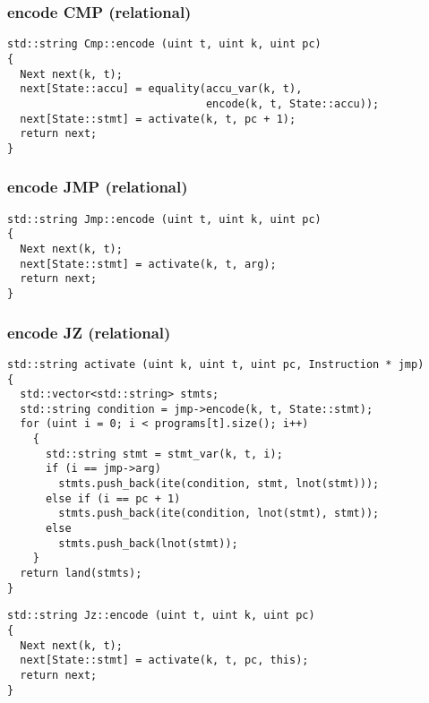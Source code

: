 \subsubsection{encode CMP (relational)}

\begin{lstlisting}[style=c++]
std::string Cmp::encode (uint t, uint k, uint pc)
{
  Next next(k, t);
  next[State::accu] = equality(accu_var(k, t),
                               encode(k, t, State::accu));
  next[State::stmt] = activate(k, t, pc + 1);
  return next;
}
\end{lstlisting}

\subsubsection{encode JMP (relational)}

\begin{lstlisting}[style=c++]
std::string Jmp::encode (uint t, uint k, uint pc)
{
  Next next(k, t);
  next[State::stmt] = activate(k, t, arg);
  return next;
}
\end{lstlisting}

\subsubsection{encode JZ (relational)}

\begin{lstlisting}[style=c++]
std::string activate (uint k, uint t, uint pc, Instruction * jmp)
{
  std::vector<std::string> stmts;
  std::string condition = jmp->encode(k, t, State::stmt);
  for (uint i = 0; i < programs[t].size(); i++)
    {
      std::string stmt = stmt_var(k, t, i);
      if (i == jmp->arg)
        stmts.push_back(ite(condition, stmt, lnot(stmt)));
      else if (i == pc + 1)
        stmts.push_back(ite(condition, lnot(stmt), stmt));
      else
        stmts.push_back(lnot(stmt));
    }
  return land(stmts);
}
\end{lstlisting}

\begin{lstlisting}[style=c++]
std::string Jz::encode (uint t, uint k, uint pc)
{
  Next next(k, t);
  next[State::stmt] = activate(k, t, pc, this);
  return next;
}
\end{lstlisting}

